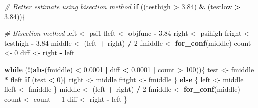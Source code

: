 \documentclass[
  10pt,
]{book}
\newenvironment{Shaded}{\begin{snugshade}}{\end{snugshade}}
\newcommand{\CommentTok}[1]{\textcolor[rgb]{0.56,0.35,0.01}{\textit{#1}}}
\newcommand{\ControlFlowTok}[1]{\textcolor[rgb]{0.13,0.29,0.53}{\textbf{#1}}}
\newcommand{\DecValTok}[1]{\textcolor[rgb]{0.00,0.00,0.81}{#1}}
\newcommand{\FloatTok}[1]{\textcolor[rgb]{0.00,0.00,0.81}{#1}}
\newcommand{\KeywordTok}[1]{\textcolor[rgb]{0.13,0.29,0.53}{\textbf{#1}}}
\newcommand{\NormalTok}[1]{#1}
\newcommand{\OperatorTok}[1]{\textcolor[rgb]{0.81,0.36,0.00}{\textbf{#1}}}
\newcommand{\StringTok}[1]{\textcolor[rgb]{0.31,0.60,0.02}{#1}}
\begin{document}
\begin{Shaded}
\begin{Highlighting}[]
  \CommentTok{\# Better estimate using bisection method}
  \ControlFlowTok{if}\NormalTok{ ((testhigh }\OperatorTok{\textgreater{}}\StringTok{ }\FloatTok{3.84}\NormalTok{) }\OperatorTok{\&}\StringTok{ }\NormalTok{(testlow }\OperatorTok{\textgreater{}}\StringTok{ }\FloatTok{3.84}\NormalTok{))\{}
    
    \CommentTok{\# Bisection method}
\NormalTok{    left \textless{}{-}}\StringTok{ }\NormalTok{psi1}
\NormalTok{    fleft \textless{}{-}}\StringTok{ }\NormalTok{objfunc }\OperatorTok{{-}}\StringTok{ }\FloatTok{3.84}
\NormalTok{    right \textless{}{-}}\StringTok{ }\NormalTok{psihigh}
\NormalTok{    fright \textless{}{-}}\StringTok{ }\NormalTok{testhigh }\OperatorTok{{-}}\StringTok{ }\FloatTok{3.84}
\NormalTok{    middle \textless{}{-}}\StringTok{ }\NormalTok{(left  }\OperatorTok{+}\StringTok{ }\NormalTok{right) }\OperatorTok{/}\StringTok{ }\DecValTok{2}
\NormalTok{    fmiddle \textless{}{-}}\StringTok{ }\KeywordTok{for\_conf}\NormalTok{(middle)}
\NormalTok{    count \textless{}{-}}\StringTok{ }\DecValTok{0}
\NormalTok{    diff \textless{}{-}}\StringTok{ }\NormalTok{right }\OperatorTok{{-}}\StringTok{ }\NormalTok{left}
    
    \ControlFlowTok{while}\NormalTok{ (}\OperatorTok{!}\NormalTok{(}\KeywordTok{abs}\NormalTok{(fmiddle) }\OperatorTok{\textless{}}\StringTok{ }\FloatTok{0.0001} \OperatorTok{|}\StringTok{ }\NormalTok{diff }\OperatorTok{\textless{}}\StringTok{ }\FloatTok{0.0001} \OperatorTok{|}\StringTok{ }\NormalTok{count }\OperatorTok{\textgreater{}}\StringTok{ }\DecValTok{100}\NormalTok{))\{}
\NormalTok{      test \textless{}{-}}\StringTok{ }\NormalTok{fmiddle }\OperatorTok{*}\StringTok{ }\NormalTok{fleft}
      \ControlFlowTok{if}\NormalTok{ (test }\OperatorTok{\textless{}}\StringTok{ }\DecValTok{0}\NormalTok{)\{}
\NormalTok{        right \textless{}{-}}\StringTok{ }\NormalTok{middle}
\NormalTok{        fright \textless{}{-}}\StringTok{ }\NormalTok{fmiddle}
\NormalTok{      \} }\ControlFlowTok{else}\NormalTok{ \{}
\NormalTok{        left \textless{}{-}}\StringTok{ }\NormalTok{middle}
\NormalTok{        fleft \textless{}{-}}\StringTok{ }\NormalTok{fmiddle}
\NormalTok{      \}}
\NormalTok{      middle \textless{}{-}}\StringTok{ }\NormalTok{(left }\OperatorTok{+}\StringTok{ }\NormalTok{right) }\OperatorTok{/}\StringTok{ }\DecValTok{2}
\NormalTok{      fmiddle \textless{}{-}}\StringTok{ }\KeywordTok{for\_conf}\NormalTok{(middle)}
\NormalTok{      count \textless{}{-}}\StringTok{ }\NormalTok{count }\OperatorTok{+}\StringTok{ }\DecValTok{1}
\NormalTok{      diff \textless{}{-}}\StringTok{ }\NormalTok{right }\OperatorTok{{-}}\StringTok{ }\NormalTok{left}
\NormalTok{    \}}
    

\end{Highlighting}
\end{Shaded}
\end{document}
